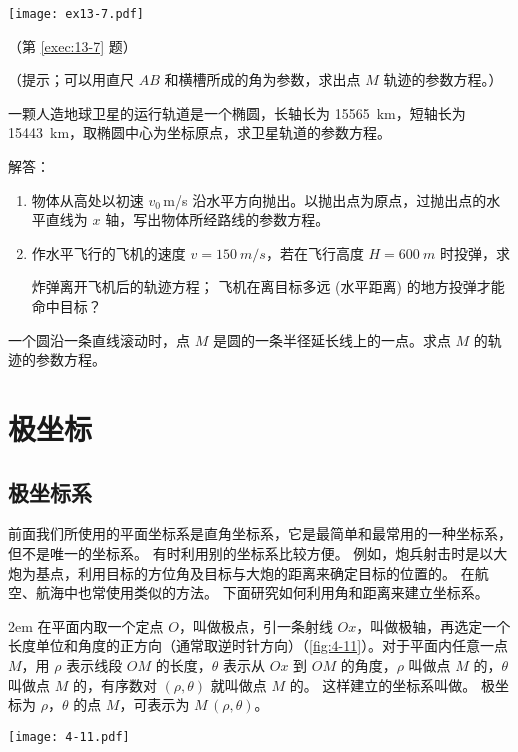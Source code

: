 \begin{Exercise}
\begin{question}
    \begin{figurehere}
      \begin{minipage}{\linewidth}\centering
        \texttt{[image: ex13-7.pdf]}
        \caption*{（第 \ref{exec:13-7} 题）}
      \end{minipage}
    \end{figurehere}
    （提示；可以用直尺 $AB$ 和横槽所成的角为参数，求出点 $M$ 轨迹的参数方程。）
    \item 一颗人造地球卫星的运行轨道是一个椭圆，长轴长为 \qty{15565}{km}，短轴长为 \qty{15443}{km}，取椭圆中心为坐标原点，求卫星轨道的参数方程。
    \item 解答：
    \begin{enumerate}[itemindent=2em]
      \item 物体从高处以初速 $v_0$\,\unit{m/s} 沿水平方向抛出。以抛出点为原点，过抛出点的水平直线为 $x$ 轴，写出物体所经路线的参数方程。
      \item 作水平飞行的飞机的速度 $v=\qty{150}{m/s}$，若在飞行高度 $H=\qty{600}{m}$ 时投弹，求
      \begin{tasks}
        \task 炸弹离开飞机后的轨迹方程；
        \task 飞机在离目标多远 (水平距离) 的地方投弹才能命中目标？
      \end{tasks}
    \end{enumerate}
    \item 一个圆沿一条直线滚动时，点 $M$ 是圆的一条半径延长线上的一点。求点 $M$ 的轨迹的参数方程。
  \end{question}
\end{Exercise}

\section{极坐标}
\subsection{极坐标系}
前面我们所使用的平面坐标系是直角坐标系，它是最简单和最常用的一种坐标系，但不是唯一的坐标系。
有时利用别的坐标系比较方便。
例如，炮兵射击时是以大炮为基点，利用目标的方位角及目标与大炮的距离来确定目标的位置的。
在航空、航海中也常使用类似的方法。
下面研究如何利用角和距离来建立坐标系。

\medskip\noindent
\begin{minipage}{0.75\linewidth}\parindent2em
在平面内取一个定点 $O$，叫做极点，引一条射线 $Ox$，叫做极轴，再选定一个长度单位和角度的正方向（通常取逆时针方向）（\cref{fig:4-11}）。对于平面内任意一点 $M$，用 $\rho$ 表示线段 $OM$ 的长度，$\theta$ 表示从 $Ox$ 到 $OM$ 的角度，$\rho$ 叫做点 $M$ 的，$\theta$ 叫做点 $M$ 的，有序数对 $(\rho,\theta)$ 就叫做点 $M$ 的。
这样建立的坐标系叫做。
极坐标为 $\rho$，$\theta$ 的点 $M$，可表示为 $M\,(\rho,\theta)$。
\end{minipage}\hfill
\begin{minipage}{0.2\linewidth}\centering
\begin{figurehere}
  \texttt{[image: 4-11.pdf]}
  \caption{}\label{fig:4-11}
\end{figurehere}
\end{minipage}

